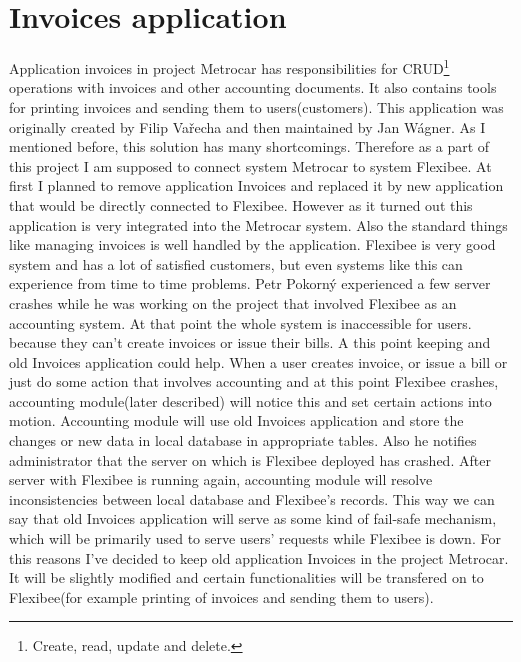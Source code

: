 \documentclass[11pt,twoside,a4paper]{book}
\begin{document}
\section{Invoices application}
Application invoices in project Metrocar has responsibilities for CRUD\footnote{Create, read, update and delete.} operations with invoices and other accounting documents.
It also contains tools for printing invoices and sending them to users(customers). This application was originally 
created by Filip Vařecha and then maintained by Jan Wágner. As I mentioned before, this solution has many shortcomings. Therefore as a part of this project I am supposed to connect system Metrocar to system Flexibee. At first I planned to remove application Invoices and replaced it by new application that would be directly connected to Flexibee. However as it turned out 
this application is very integrated into the Metrocar system. Also the standard things like managing invoices is well handled by the application. Flexibee is very good system and has a lot of satisfied customers, but even systems like this can experience from time to time problems. Petr Pokorný experienced a few server crashes while he was working on the project that involved Flexibee as an accounting system. At that point the whole system is inaccessible for users. because they can't create invoices or issue their bills. A this point keeping and old Invoices application could help. When a user creates invoice, or issue a bill or just do some action that involves accounting and at this point Flexibee crashes, accounting module(later described) will notice this and set certain actions into motion. Accounting module will use old Invoices application and store the changes or new data in local database in appropriate tables. Also he notifies administrator that the server on which is Flexibee deployed has crashed. After server with Flexibee is running again, accounting module will resolve inconsistencies between local database and Flexibee's records. This way we can say that old Invoices application will serve as some kind of fail-safe mechanism, which will be primarily used to serve users' requests while Flexibee is down. For this reasons I've decided to keep old application Invoices in the project Metrocar. It will be slightly modified and certain functionalities will be transfered on to Flexibee(for example printing of invoices and sending them to users). 	
\end{document}
